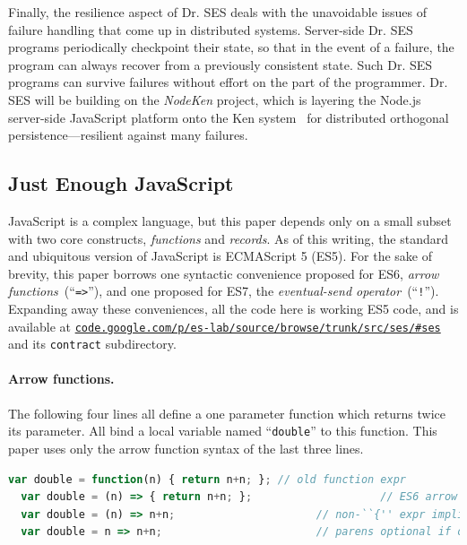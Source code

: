 \documentclass{llncs}
\newcommand{\myurl}[1]{{\href{http://#1}{\texttt{#1}}}}
\begin{document}
Finally, the resilience aspect of Dr. SES deals with the unavoidable issues of failure handling that come up in distributed systems. 
Server-side Dr. SES programs periodically checkpoint their state, so that in the event of a failure, the program can always recover from a previously consistent state. Such Dr. SES programs can survive failures without effort on the part of the programmer. Dr. SES will be building on the \emph{NodeKen} project, which is layering the Node.js server-side JavaScript platform onto the Ken system~\cite{Yoo:CKen} for distributed orthogonal persistence---resilient against many failures.



\subsection{Just Enough JavaScript}
\label{enoughjs}

JavaScript is a complex language, but this paper depends only on a small subset with two core constructs, \emph{functions} and \emph{records}. As of this writing, the standard and ubiquitous version of JavaScript is ECMAScript 5 (ES5). For the sake of brevity, this paper borrows one syntactic convenience proposed for ES6, \emph{arrow functions}~(``{\tt =>}''), and one proposed for ES7, the \emph{eventual-send operator}~(``{\tt !}''). Expanding away these conveniences, all the code here is working ES5 code, and is available at \myurl{code.google.com/p/es-lab/source/browse/trunk/src/ses/\#ses} and its {\tt contract} subdirectory.

\paragraph{Arrow functions.} 

The following four lines all define a one parameter function which returns twice its parameter. All bind a local variable named ``{\tt double}'' to this function. This paper uses only the arrow function syntax of the last three lines.

\begin{lstlisting}[language=JavaScript,numbers=none]
  var double = function(n) { return n+n; }; // old function expr
  var double = (n) => { return n+n; };                    // ES6 arrow function
  var double = (n) => n+n;                      // non-``{'' expr implicitly returned
  var double = n => n+n;                        // parens optional if one param
\end{lstlisting}
\end{document}
